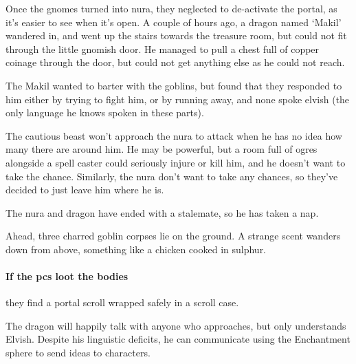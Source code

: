 \begin{multicols}{2}


\begin{exampletext}

  Once the gnomes turned into nura, they neglected to de-activate the portal, as it's easier to see when it's open.
  A couple of hours ago, a dragon named `Makil' wandered in, and went up the stairs towards the treasure room, but could not fit through the little gnomish door.
  He managed to pull a chest full of copper coinage through the door, but could not get anything else as he could not reach.

  The Makil wanted to barter with the goblins, but found that they responded to him either by trying to fight him, or by running away, and none spoke elvish (the only language he knows spoken in these parts).

  The cautious beast won't approach the nura to attack when he has no idea how many there are around him.
  He may be powerful, but a room full of ogres alongside a spell caster could seriously injure or kill him, and he doesn't want to take the chance.
  Similarly, the nura don't want to take any chances, so they've decided to just leave him where he is.

  The nura and dragon have ended with a stalemate, so he has taken a nap.

\end{exampletext}

\begin{boxtext}

  Ahead, three charred goblin corpses lie on the ground.
  A strange scent wanders down from above, something like a chicken cooked in sulphur.

\end{boxtext}

\paragraph{If the \glspl{pc} loot the bodies}
they find a portal scroll wrapped safely in a scroll case.


The dragon will happily talk with anyone who approaches, but only understands Elvish.
\iftoggle{hardcore}{}{%
  Remind the players that they can spend a Story Point to say that they know another language, as long as they say when they learnt the language.
}
Despite his linguistic deficits, he can communicate using the Enchantment sphere to send ideas to characters.


\end{multicols}
